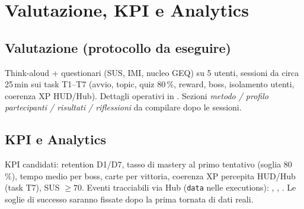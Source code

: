 \chapter{Valutazione, KPI e Analytics}
\label{g:valutazione}

\section{Valutazione (protocollo da eseguire)}
Think-aloud + questionari (SUS, IMI, nucleo GEQ) su 5 utenti, sessioni
da circa 25\,min sui task T1--T7 (avvio, topic, quiz 80\,\%, reward,
boss, isolamento utenti, coerenza XP HUD/Hub). Dettagli operativi in
. Sezioni \textit{metodo /
profilo partecipanti / risultati / riflessioni} da compilare dopo le
sessioni.

\medskip
\noindent{}

\section{KPI e Analytics}
KPI candidati: retention D1/D7, tasso di mastery al primo tentativo
(soglia 80\,\%), tempo medio per boss, carte per vittoria, coerenza XP
percepita HUD/Hub (task T7), SUS $\geq 70$.
Eventi tracciabili via Hub (\texttt{data} nelle executions):
, ,
. Le soglie di successo saranno fissate dopo la
prima tornata di dati reali.
